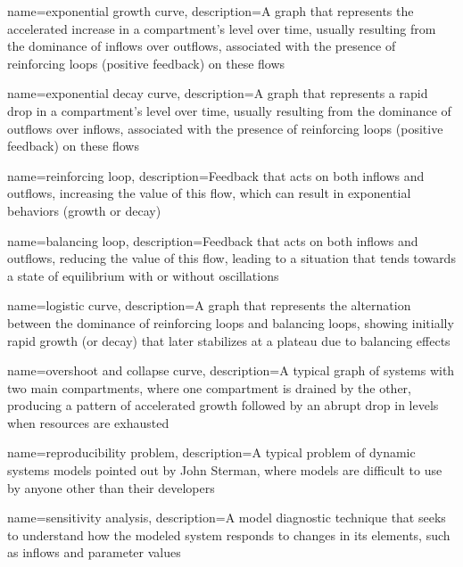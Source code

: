 {
    name=exponential growth curve,
    description={A graph that represents the accelerated increase in a compartment's level over time, usually resulting from the dominance of inflows over outflows, associated with the presence of reinforcing loops (positive feedback) on these flows}
}

{
    name=exponential decay curve,
    description={A graph that represents a rapid drop in a compartment's level over time, usually resulting from the dominance of outflows over inflows, associated with the presence of reinforcing loops (positive feedback) on these flows}
}

{
    name=reinforcing loop,
    description={Feedback that acts on both inflows and outflows, increasing the value of this flow, which can result in exponential behaviors (growth or decay)}
}

{
    name=balancing loop,
    description={Feedback that acts on both inflows and outflows, reducing the value of this flow, leading to a situation that tends towards a state of equilibrium with or without oscillations}
}

{
    name=logistic curve,
    description={A graph that represents the alternation between the dominance of reinforcing loops and balancing loops, showing initially rapid growth (or decay) that later stabilizes at a plateau due to balancing effects}
}

{
    name=overshoot and collapse curve,
    description={A typical graph of systems with two main compartments, where one compartment is drained by the other, producing a pattern of accelerated growth followed by an abrupt drop in levels when resources are exhausted}
}

{
    name=reproducibility problem,
    description={A typical problem of dynamic systems models pointed out by John Sterman, where models are difficult to use by anyone other than their developers}
}

{
    name=sensitivity analysis,
    description={A model diagnostic technique that seeks to understand how the modeled system responds to changes in its elements, such as inflows and parameter values}
}

